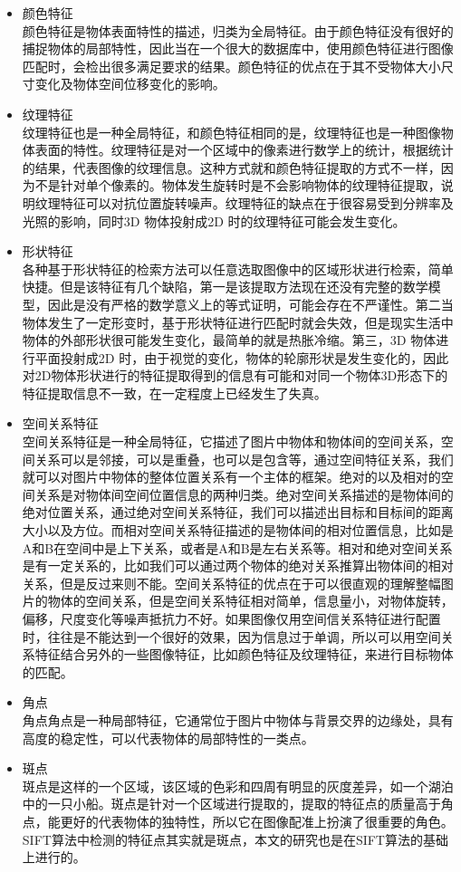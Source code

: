 \begin{itemize}
\item 颜色特征\\颜色特征是物体表面特性的描述，归类为全局特征。由于颜色特征没有很好的捕捉物体的局部特性，因此当在一个很大的数据库中，使用颜色特征进行图像匹配时，会检出很多满足要求的结果。颜色特征的优点在于其不受物体大小尺寸变化及物体空间位移变化的影响。
\item 纹理特征\\纹理特征也是一种全局特征，和颜色特征相同的是，纹理特征也是一种图像物体表面的特性。纹理特征是对一个区域中的像素进行数学上的统计，根据统计的结果，代表图像的纹理信息。这种方式就和颜色特征提取的方式不一样，因为不是针对单个像素的。物体发生旋转时是不会影响物体的纹理特征提取，说明纹理特征可以对抗位置旋转噪声。纹理特征的缺点在于很容易受到分辨率及光照的影响，同时3D 物体投射成2D 时的纹理特征可能会发生变化。
\item 形状特征\\各种基于形状特征的检索方法可以任意选取图像中的区域形状进行检索，简单快捷。但是该特征有几个缺陷，第一是该提取方法现在还没有完整的数学模型，因此是没有严格的数学意义上的等式证明，可能会存在不严谨性。第二当物体发生了一定形变时，基于形状特征进行匹配时就会失效，但是现实生活中物体的外部形状很可能发生变化，最简单的就是热胀冷缩。第三，3D 物体进行平面投射成2D 时，由于视觉的变化，物体的轮廓形状是发生变化的，因此对2D物体形状进行的特征提取得到的信息有可能和对同一个物体3D形态下的特征提取信息不一致，在一定程度上已经发生了失真。
\item 空间关系特征\\空间关系特征是一种全局特征，它描述了图片中物体和物体间的空间关系，空间关系可以是邻接，可以是重叠，也可以是包含等，通过空间特征关系，我们就可以对图片中物体的整体位置关系有一个主体的框架。绝对的以及相对的空间关系是对物体间空间位置信息的两种归类。绝对空间关系描述的是物体间的绝对位置关系，通过绝对空间关系特征，我们可以描述出目标和目标间的距离大小以及方位。而相对空间关系特征描述的是物体间的相对位置信息，比如是A和B在空间中是上下关系，或者是A和B是左右关系等。相对和绝对空间关系是有一定关系的，比如我们可以通过两个物体的绝对关系推算出物体间的相对关系，但是反过来则不能。空间关系特征的优点在于可以很直观的理解整幅图片的物体的空间关系，但是空间关系特征相对简单，信息量小，对物体旋转，偏移，尺度变化等噪声抵抗力不好。如果图像仅用空间信关系特征进行配置时，往往是不能达到一个很好的效果，因为信息过于单调，所以可以用空间关系特征结合另外的一些图像特征，比如颜色特征及纹理特征，来进行目标物体的匹配。
\item 角点 \\角点角点是一种局部特征，它通常位于图片中物体与背景交界的边缘处，具有高度的稳定性，可以代表物体的局部特性的一类点。
\item 斑点\\斑点是这样的一个区域，该区域的色彩和四周有明显的灰度差异，如一个湖泊中的一只小船。斑点是针对一个区域进行提取的，提取的特征点的质量高于角点，能更好的代表物体的独特性，所以它在图像配准上扮演了很重要的角色。SIFT算法中检测的特征点其实就是斑点，本文的研究也是在SIFT算法的基础上进行的。
\end{itemize}

